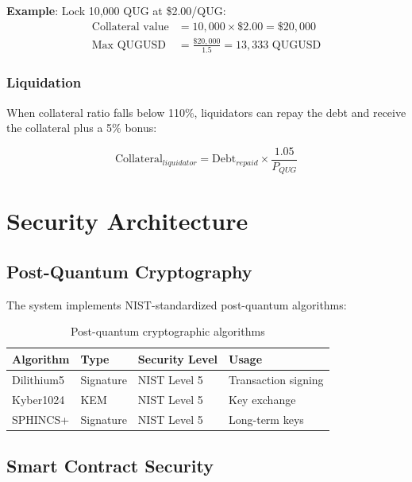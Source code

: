 \documentclass[11pt,a4paper]{article}
\begin{document}
\textbf{Example}: Lock 10,000 QUG at \$2.00/QUG:
\begin{align*}
\text{Collateral value} &= 10,000 \times \$2.00 = \$20,000 \\
\text{Max QUGUSD} &= \frac{\$20,000}{1.5} = 13,333 \text{ QUGUSD}
\end{align*}

\subsubsection{Liquidation}

When collateral ratio falls below 110\%, liquidators can repay the debt and receive the collateral plus a 5\% bonus:

\begin{equation}
\text{Collateral}_{liquidator} = \text{Debt}_{repaid} \times \frac{1.05}{P_{QUG}}
\end{equation}

\section{Security Architecture}

\subsection{Post-Quantum Cryptography}

The system implements NIST-standardized post-quantum algorithms:

\begin{table}[H]
\centering
\begin{tabular}{llll}
\toprule
\textbf{Algorithm} & \textbf{Type} & \textbf{Security Level} & \textbf{Usage} \\
\midrule
Dilithium5 & Signature & NIST Level 5 & Transaction signing \\
Kyber1024 & KEM & NIST Level 5 & Key exchange \\
SPHINCS+ & Signature & NIST Level 5 & Long-term keys \\
\bottomrule
\end{tabular}
\caption{Post-quantum cryptographic algorithms}
\end{table}

\subsection{Smart Contract Security}
\end{document}
